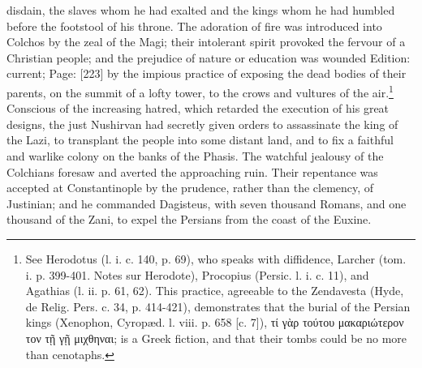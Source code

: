 disdain, the slaves whom he had exalted and the kings whom he had humbled before the footstool of his throne. The adoration of fire was introduced into Colchos by the zeal of the Magi; their intolerant spirit provoked the fervour of a Christian people; and the prejudice of nature or education was wounded Edition: current; Page: [223] by the impious practice of exposing the dead bodies of their parents, on the summit of a lofty tower, to the crows and vultures of the air.\footnote{See Herodotus (l. i. c. 140, p. 69), who speaks with diffidence, Larcher (tom. i. p. 399-401. Notes sur Herodote), Procopius (Persic. l. i. c. 11), and Agathias (l. ii. p. 61, 62). This practice, agreeable to the Zendavesta (Hyde, de Relig. Pers. c. 34, p. 414-421), demonstrates that the burial of the Persian kings (Xenophon, Cyropæd. l. viii. p. 658 [c. 7]), \textgreek{τί γ\texthebrew{ὰ}ρ τούτου μακαριώτερον τον τ\texthebrew{ῇ} γ\texthebrew{ῇ} μιχθηναι}; is a Greek fiction, and that their tombs could be no more than cenotaphs.} Conscious of the increasing hatred, which retarded the execution of his great designs, the just Nushirvan had secretly given orders to assassinate the king of the Lazi, to transplant the people into some distant land, and to fix a faithful and warlike colony on the banks of the Phasis. The watchful jealousy of the Colchians foresaw and averted the approaching ruin. Their repentance was accepted at Constantinople by the prudence, rather than the clemency, of Justinian; and he commanded Dagisteus, with seven thousand Romans, and one thousand of the Zani, to expel the Persians from the coast of the Euxine.

